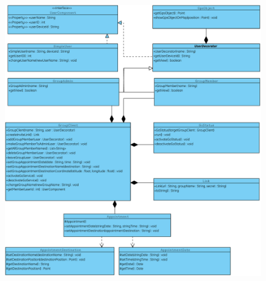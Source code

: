 \begin{figure}[H]
	\includegraphics[scale = .5]{res/umlDiagramms/modelClientObjectStructure.pdf}
	\centering	
\end{figure}

